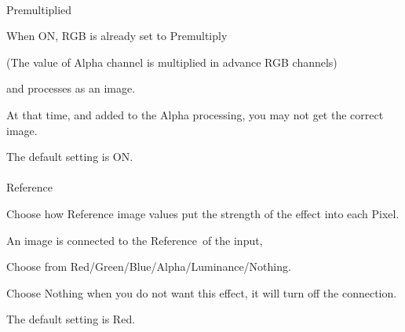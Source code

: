 \documentclass[a4paper,12pt]{article}
\begin{document}
\newpage

\thispagestyle{empty}

\ \vspace{-0.2em}
\par
\noindent Premultiplied\par
When ON, RGB is already set to Premultiply\par
(The value of Alpha channel is multiplied in advance RGB channels)\par
and processes as an image.\par
At that time, and added to the Alpha processing, you may not get the correct image.\par
The default setting is ON.\\
\\
Reference\par
Choose how Reference image values put the strength of the effect into each Pixel.\par
An image is connected to the \textquotedbl Reference\textquotedbl \ of the input,\par
Choose from Red/Green/Blue/Alpha/Luminance/Nothing.\par
Choose Nothing when you do not want this effect, it will turn off the connection.\par
The default setting is Red.
\end{document}
